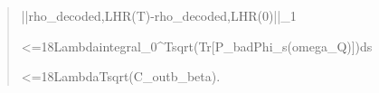 \documentclass[
]{article}
\begin{document}
\begin{quote}\small\ttfamily\raggedright\setlength{\parskip}{0pt}
\noindent |\allowbreak{}|\allowbreak{}r\allowbreak{}h\allowbreak{}o\allowbreak{}\_\allowbreak{}d\allowbreak{}e\allowbreak{}c\allowbreak{}o\allowbreak{}d\allowbreak{}e\allowbreak{}d\allowbreak{},\allowbreak{}L\allowbreak{}H\allowbreak{}R\allowbreak{}(\allowbreak{}T\allowbreak{})\allowbreak{}-\allowbreak{}r\allowbreak{}h\allowbreak{}o\allowbreak{}\_\allowbreak{}d\allowbreak{}e\allowbreak{}c\allowbreak{}o\allowbreak{}d\allowbreak{}e\allowbreak{}d\allowbreak{},\allowbreak{}L\allowbreak{}H\allowbreak{}R\allowbreak{}(\allowbreak{}0\allowbreak{})\allowbreak{}|\allowbreak{}|\allowbreak{}\_\allowbreak{}1\par
\noindent \hspace*{0.525em}\allowbreak{}\hspace*{0.525em}\allowbreak{}\hspace*{0.525em}\allowbreak{}<\allowbreak{}=\allowbreak{}1\allowbreak{}8\allowbreak{}\hspace*{0.525em}\allowbreak{}L\allowbreak{}a\allowbreak{}m\allowbreak{}b\allowbreak{}d\allowbreak{}a\allowbreak{}\hspace*{0.525em}\allowbreak{}i\allowbreak{}n\allowbreak{}t\allowbreak{}e\allowbreak{}g\allowbreak{}r\allowbreak{}a\allowbreak{}l\allowbreak{}\_\allowbreak{}0\allowbreak{}\^{}\allowbreak{}T\allowbreak{}\hspace*{0.525em}\allowbreak{}s\allowbreak{}q\allowbreak{}r\allowbreak{}t\allowbreak{}(\allowbreak{}T\allowbreak{}r\allowbreak{}[\allowbreak{}P\allowbreak{}\_\allowbreak{}b\allowbreak{}a\allowbreak{}d\allowbreak{}\hspace*{0.525em}\allowbreak{}P\allowbreak{}h\allowbreak{}i\allowbreak{}\_\allowbreak{}s\allowbreak{}(\allowbreak{}o\allowbreak{}m\allowbreak{}e\allowbreak{}g\allowbreak{}a\allowbreak{}\_\allowbreak{}Q\allowbreak{})\allowbreak{}]\allowbreak{})\allowbreak{}d\allowbreak{}s\par
\noindent \hspace*{0.525em}\allowbreak{}\hspace*{0.525em}\allowbreak{}\hspace*{0.525em}\allowbreak{}<\allowbreak{}=\allowbreak{}1\allowbreak{}8\allowbreak{}\hspace*{0.525em}\allowbreak{}L\allowbreak{}a\allowbreak{}m\allowbreak{}b\allowbreak{}d\allowbreak{}a\allowbreak{}\hspace*{0.525em}\allowbreak{}T\allowbreak{}\hspace*{0.525em}\allowbreak{}s\allowbreak{}q\allowbreak{}r\allowbreak{}t\allowbreak{}(\allowbreak{}C\allowbreak{}\_\allowbreak{}o\allowbreak{}u\allowbreak{}t\allowbreak{}\hspace*{0.525em}\allowbreak{}b\allowbreak{}\_\allowbreak{}b\allowbreak{}e\allowbreak{}t\allowbreak{}a\allowbreak{})\allowbreak{}.\par
\end{quote}
\end{document}
